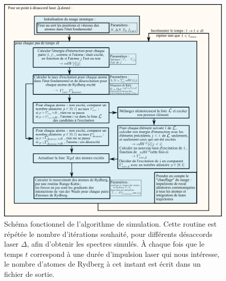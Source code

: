 \begin{figure}[h]
\hspace{-.18\linewidth}
\includegraphics[width=1.3\linewidth]{figures/apx/simus_interactions}
\caption[Schéma fonctionnel de l'algorithme de simulation]
{
Schéma fonctionnel de l'algorithme de simulation.
Cette routine est répétée le nombre d'itérations souhaité, pour différents désaccords laser $\Delta$, afin d'obtenir les spectres simulés.
À chaque fois que le temps $t$ correspond à une durée d'impulsion laser qui nous intéresse, le nombre d'atomes de Rydberg à cet instant est écrit dans un fichier de sortie.
}
\label{fig:algo_sim_spectresoptiques}
\end{figure}
\clearpage